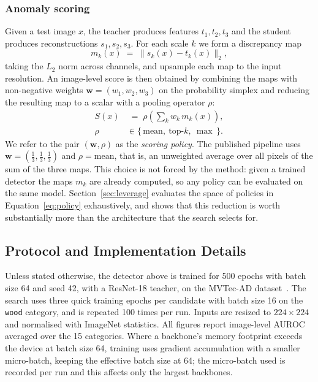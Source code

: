 \subsubsection*{Anomaly scoring}
\label{subsubsec:scoring}
Given a test image $x$, the teacher produces features $t_1, t_2, t_3$ and the
student produces reconstructions $s_1, s_2, s_3$. For each scale $k$ we form a
discrepancy map
%
\begin{equation}
\label{eq:diffmap}
m_k(x) \;=\; \bigl\| s_k(x) - t_k(x) \bigr\|_2 ,
\end{equation}
%
taking the $L_2$ norm across channels, and upsample each map to the input
resolution. An image-level score is then obtained by combining the maps with
non-negative weights $\mathbf{w} = (w_1, w_2, w_3)$ on the probability simplex and
reducing the resulting map to a scalar with a pooling operator $\rho$:
%
\begin{equation}
\label{eq:policy}
\begin{aligned}
S(x) &\;=\; \rho\!\left( \textstyle\sum_{k} w_k \, m_k(x) \right), \\
\rho &\in \{\,\text{mean},\ \text{top-}k,\ \max\,\}.
\end{aligned}
\end{equation}
%
We refer to the pair $(\mathbf{w}, \rho)$ as the \emph{scoring policy}. The
published pipeline uses $\mathbf{w} = (\tfrac13,\tfrac13,\tfrac13)$ and
$\rho = \text{mean}$, that is, an unweighted average over all pixels of the sum of
the three maps. This choice is not forced by the method: given a trained detector
the maps $m_k$ are already computed, so any policy can be evaluated on the same
model. Section~\ref{sec:leverage} evaluates the space of policies in
Equation~\eqref{eq:policy} exhaustively, and shows that this reduction is worth
substantially more than the architecture that the search selects for.

\subsection{Protocol and Implementation Details}
\label{subsec:implementation}

Unless stated otherwise, the detector above is trained for 500 epochs with batch
size 64 and seed 42, with a ResNet-18 teacher, on the MVTec-AD
dataset~\cite{bergmann2021mvtec}. The search uses three quick training epochs per
candidate with batch size 16 on the \texttt{wood} category, and is repeated 100
times per run. Inputs are resized to $224\times224$ and normalised with ImageNet
statistics. All figures report image-level AUROC averaged over the 15 categories.
Where a backbone's memory footprint exceeds the device at batch size 64, training
uses gradient accumulation with a smaller micro-batch, keeping the effective batch
size at 64; the micro-batch used is recorded per run and this affects only the
largest backbones.
